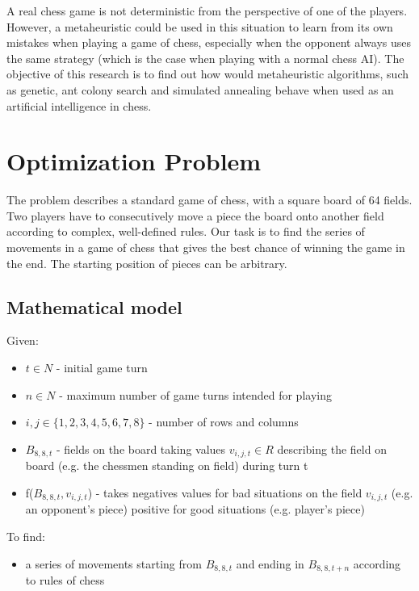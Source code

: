 \documentclass[pdftex]{article}
\begin{document}
A real chess game is not deterministic from the perspective of one of the players. However, a metaheuristic could be used in this situation to learn from its own mistakes when playing a game of chess, especially when the opponent always uses the same strategy (which is the case when playing with a normal chess AI). The objective of this research is to find out how would metaheuristic algorithms, such as genetic, ant colony search and simulated annealing behave when used as an artificial intelligence in chess.

\section{Optimization Problem}
\label{sec:problem}

The problem describes a standard game of chess, with a square board of 64 fields. Two players have to consecutively move a piece the board onto another field according to complex, well-defined rules. Our task is to find the series of movements in a game of chess that gives the best chance of winning the game in the end. The starting position of pieces can be arbitrary. 

\subsection{Mathematical model}
\label{sec:model}

Given:
\begin{itemize}
 	\item $t \in N$ - initial game turn 
 	\item $n \in N$ - maximum number of game turns intended for playing 
 	\item $i,j \in \{1,2,3,4,5,6,7,8\}$ - number of rows and columns
 	\item $B_{8,8,t}$ - fields on the board taking values $v_{i,j,t}\in R$ describing the field on board (e.g. the chessmen standing on field) during turn t
 	\item f($B_{8,8,t},v_{i,j,t}$) - takes negatives values for bad situations on the field $v_{i,j,t}$ (e.g. an opponent's piece) positive for good situations (e.g. player's piece)
\end{itemize}

To find:

\begin{itemize}
	\item a series of movements starting from $B_{8,8,t}$ and ending in $B_{8,8,t+n}$ according to rules of chess
\end{itemize}
\end{document}
